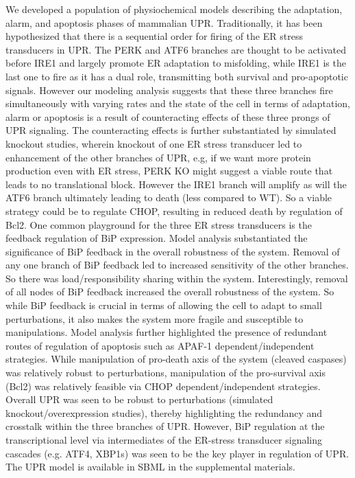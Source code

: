 \documentclass[fleqn,10pt]{wlscirep}
\begin{document}
We developed a population of physiochemical models describing the adaptation, alarm, and apoptosis phases of mammalian UPR. Traditionally, it has been hypothesized that there is a sequential order for firing of the ER stress transducers in UPR. The PERK and ATF6 branches are thought to be activated before IRE1 \cite{szegezdi2006mediators} and largely promote ER adaptation to misfolding, while IRE1 is the last one to fire as it has a dual role, transmitting both survival and pro-apoptotic signals. However our modeling analysis suggests that these three branches fire simultaneously with varying rates and the state of the cell in terms of adaptation, alarm or apoptosis is a result of counteracting effects of these three prongs of UPR signaling. The counteracting effects is further substantiated by simulated knockout studies, wherein knockout of one ER stress transducer led to enhancement of the other branches of UPR, e.g, if we want more protein production even with ER stress, PERK KO might suggest a viable route that leads to no translational block. However the IRE1 branch will amplify as will the ATF6 branch ultimately leading to death (less compared to WT). So a viable strategy could be to regulate CHOP, resulting in reduced death by regulation of Bcl2. One common playground for the three ER stress transducers is the feedback regulation of BiP expression. Model analysis substantiated the significance of BiP feedback in the overall robustness of the system. Removal of any one branch of BiP feedback led to increased sensitivity of the other branches. So there was load/responsibility sharing within the system. Interestingly, removal of all nodes of BiP feedback increased the overall robustness of the system. So while BiP feedback is crucial in terms of allowing the cell to adapt to small perturbations, it also makes the system more fragile and susceptible to manipulations. Model analysis further highlighted the presence of redundant routes of regulation of apoptosis such as APAF-1 dependent/independent strategies. While manipulation of pro-death axis of the system (cleaved caspases) was relatively robust to perturbations, manipulation of the pro-survival axis (Bcl2) was relatively feasible via CHOP dependent/independent strategies. Overall UPR was seen to be robust to perturbations (simulated knockout/overexpression studies), thereby highlighting the redundancy and crosstalk within the three branches of UPR. However, BiP regulation at the transcriptional level via intermediates of the ER-stress transducer signaling cascades (e.g. ATF4, XBP1s) was seen to be the key player in regulation of UPR. 
The UPR model is available in SBML in the supplemental materials.
\end{document}
